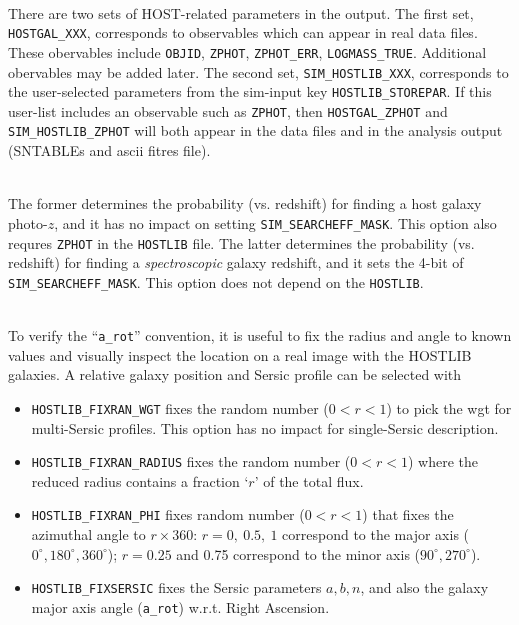 \documentclass[12pt]{article}
\begin{document}
{%
\bigskip
{} \\
There are two sets of HOST-related parameters in the output.
The first set, {\tt HOSTGAL\_XXX}, corresponds to observables
which can appear in real data files. These obervables include
{\tt OBJID}, {\tt ZPHOT}, {\tt ZPHOT\_ERR}, {\tt LOGMASS\_TRUE}.
Additional obervables may be added later.  The second set,
{\tt SIM\_HOSTLIB\_XXX}, corresponds to the user-selected
parameters from the sim-input key {\tt HOSTLIB\_STOREPAR}.
If this user-list includes an observable such as {\tt ZPHOT},
then {\tt HOSTGAL\_ZPHOT} and {\tt SIM\_HOSTLIB\_ZPHOT} 
will both appear in the data files and in the 
analysis output (SNTABLEs and ascii fitres file).


\bigskip 
{}\\
The former determines the probability (vs. redshift) for finding
a host galaxy photo-$z$, and it has no impact on setting
{\tt SIM\_SEARCHEFF\_MASK}. This option also requres {\tt ZPHOT} 
in the {\tt HOSTLIB} file.
The latter determines the probability (vs. redshift) for finding
a {\it spectroscopic} galaxy redshift, and it sets the 4-bit of
{\tt SIM\_SEARCHEFF\_MASK}. This option does not depend on the
{\tt HOSTLIB}.



\bigskip
{} \\
To verify the ``{\tt a\_rot}'' convention, it is useful to fix the
radius and angle to known values and visually inspect the location
on a real image with the HOSTLIB galaxies. A relative
galaxy position and Sersic profile can be selected with
\begin{itemize}
  \item \verb|HOSTLIB_FIXRAN_WGT| fixes the random number ($0<r<1$)
    to pick the wgt for multi-Sersic profiles. This option has no
    impact for single-Sersic description.
%
  \item \verb|HOSTLIB_FIXRAN_RADIUS| fixes the random number ($0<r<1$)
         where the reduced radius contains a fraction  
         `$r$' of the total flux.
%
  \item \verb|HOSTLIB_FIXRAN_PHI| fixes random number ($0<r<1$) 
        that fixes the azimuthal angle to $r\times 360$:
        $r=0,~0.5,~1$ correspond to the major axis 
        ($0^{\circ},180^{\circ},360^{\circ}$); 
        $r=0.25$ and 0.75 correspond to the minor axis
        ($90^{\circ},270^{\circ}$).
%
 \item \verb|HOSTLIB_FIXSERSIC| fixes the Sersic parameters
       $a,b,n$, and also the galaxy major axis angle ({\tt a\_rot})
       w.r.t. Right Ascension.
\end{itemize}


}
\end{document}
